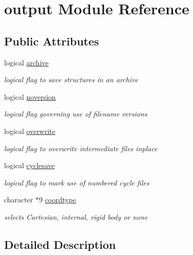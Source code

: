 \hypertarget{classoutput}{\section{output Module Reference}
\label{classoutput}
}
\subsection*{Public Attributes}
\begin{DoxyCompactItemize}
\item 
logical \hyperlink{classoutput_a8c613097bea1523e4b41134ef206bf76}{archive}
\begin{DoxyCompactList}\small\item\em logical flag to save structures in an archive \end{DoxyCompactList}\item 
logical \hyperlink{classoutput_a853cd8901c51bb24a21f26abe5e0dea5}{noversion}
\begin{DoxyCompactList}\small\item\em logical flag governing use of filename versions \end{DoxyCompactList}\item 
logical \hyperlink{classoutput_a2a293ea1d31588e0629411b07d460c14}{overwrite}
\begin{DoxyCompactList}\small\item\em logical flag to overwrite intermediate files inplace \end{DoxyCompactList}\item 
logical \hyperlink{classoutput_ad796e84da751550338170c3d7a890d00}{cyclesave}
\begin{DoxyCompactList}\small\item\em logical flag to mark use of numbered cycle files \end{DoxyCompactList}\item 
character $\ast$9 \hyperlink{classoutput_aae5c9e96b1f9abab3ea8bdc557f4c5d4}{coordtype}
\begin{DoxyCompactList}\small\item\em selects Cartesian, internal, rigid body or none \end{DoxyCompactList}\end{DoxyCompactItemize}


\subsection{Detailed Description}


